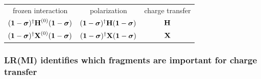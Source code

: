 \documentclass[%
    xcolor=usenames,dvipsnames,svgnames%
]{beamer}
\begin{document}
\begin{frame}
\begin{table}
\begin{tabular}{ccc}
      frozen interaction & polarization & charge transfer \\
      \((\boldsymbol{\mathbf{1}} - \boldsymbol{\mathbf{\sigma}})^{\dagger} \boldsymbol{\mathbf{H}}^{(0)} (\boldsymbol{\mathbf{1}} - \boldsymbol{\mathbf{\sigma}})\) & \((\boldsymbol{\mathbf{1}} - \boldsymbol{\mathbf{\sigma}})^{\dagger} \boldsymbol{\mathbf{H}} (\boldsymbol{\mathbf{1}} - \boldsymbol{\mathbf{\sigma}})\) & \(\boldsymbol{\mathbf{H}}\) \\
      \((\boldsymbol{\mathbf{1}} - \boldsymbol{\mathbf{\sigma}})^{\dagger} \boldsymbol{\mathbf{X}}^{(0)} (\boldsymbol{\mathbf{1}} - \boldsymbol{\mathbf{\sigma}})\) & \((\boldsymbol{\mathbf{1}} - \boldsymbol{\mathbf{\sigma}})^{\dagger} \boldsymbol{\mathbf{X}} (\boldsymbol{\mathbf{1}} - \boldsymbol{\mathbf{\sigma}})\) & \(\boldsymbol{\mathbf{X}}\)
    \end{tabular}
  \end{table}
\end{frame}

\begin{frame}
  \frametitle{LR(MI) identifies which fragments are important for charge transfer}
  \begin{table}
    \centering
    \begin{tabular}{ccc}

\end{tabular}
\end{table}
\end{frame}
\end{document}
